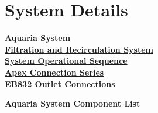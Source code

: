 \documentclass[]{book}
\begin{document}
\hypertarget{system-details}{\chapter{System
Details}\label{system-details}}

\protect\hyperlink{Tank_System}{\textbf{Aquaria System}}\\
\protect\hyperlink{Filtration_and_Recirculation_System}{\textbf{Filtration
and Recirculation System}}\\
\protect\hyperlink{System_Operational_Sequence}{\textbf{System
Operational Sequence}}\\
\protect\hyperlink{Apex_Connection_Series}{\textbf{Apex Connection
Series}}\\
\protect\hyperlink{EB832_Outlet_Connections}{\textbf{EB832 Outlet
Connections}}

 \textbf{Aquaria System Component List}
\end{document}
